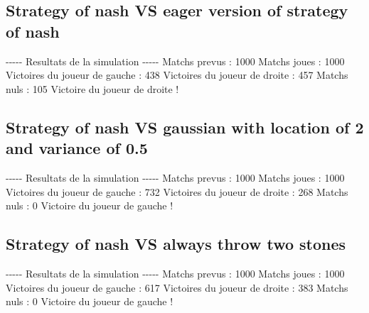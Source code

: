 \documentclass{article}%
\begin{document}
%
\subsection{Strategy of nash VS eager version of strategy of nash}%
\label{subsec:Strategy of nash VS eager version of strategy of nash}%
{-}{-}{-}{-}{-} Resultats de la simulation {-}{-}{-}{-}{-}\newline%
		\newline%
Matchs prevus : 1000\newline%
Matchs joues : 1000\newline%
\newline%
Victoires du joueur de gauche : 438\newline%
Victoires du joueur de droite : 457\newline%
Matchs nuls : 105\newline%
\newline%
Victoire du joueur de droite !

%
\subsection{Strategy of nash VS gaussian with location of 2 and variance of 0.5}%
\label{subsec:Strategy of nash VS gaussian with location of 2 and variance of 0.5}%
{-}{-}{-}{-}{-} Resultats de la simulation {-}{-}{-}{-}{-}\newline%
		\newline%
Matchs prevus : 1000\newline%
Matchs joues : 1000\newline%
\newline%
Victoires du joueur de gauche : 732\newline%
Victoires du joueur de droite : 268\newline%
Matchs nuls : 0\newline%
\newline%
Victoire du joueur de gauche !

%
\subsection{Strategy of nash VS always throw two stones}%
\label{subsec:Strategy of nash VS always throw two stones}%
{-}{-}{-}{-}{-} Resultats de la simulation {-}{-}{-}{-}{-}\newline%
		\newline%
Matchs prevus : 1000\newline%
Matchs joues : 1000\newline%
\newline%
Victoires du joueur de gauche : 617\newline%
Victoires du joueur de droite : 383\newline%
Matchs nuls : 0\newline%
\newline%
Victoire du joueur de gauche !
\end{document}
